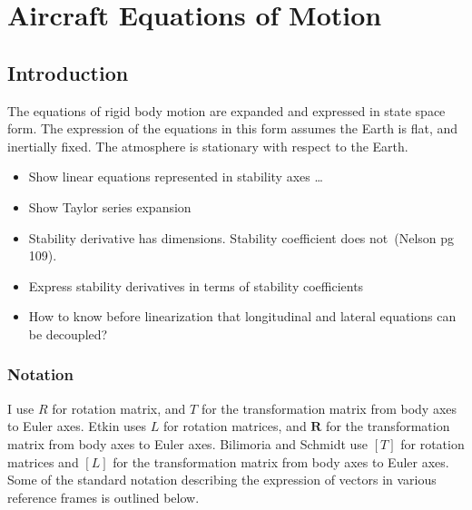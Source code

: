 \chapter{Aircraft Equations of Motion}

\section{Introduction}

The equations of rigid body motion are expanded and expressed in state space form.
The expression of the equations in this form assumes the Earth is flat, and inertially fixed.
The atmosphere is stationary with respect to the Earth.

\begin{itemize}
  \item{Show linear equations represented in stability axes \dots}
  \item{Show Taylor series expansion}
  \item{%
    Stability derivative has dimensions.
    Stability coefficient does not\ (Nelson pg 109).
  }
  \item{Express stability derivatives in terms of stability coefficients}
  \item{How to know before linearization that longitudinal and lateral equations can be decoupled?}
\end{itemize}

\subsection{Notation}

I use $R$ for rotation matrix, and $T$ for the transformation matrix from body axes to Euler axes.
Etkin uses $L$ for rotation matrices, and $\boldsymbol{R}$ for the transformation matrix from body axes to Euler axes.
Bilimoria and Schmidt use $[T]$ for rotation matrices and $[L]$ for the transformation matrix from body axes to Euler axes.
Some of the standard notation describing the expression of vectors in various reference frames is outlined below.

